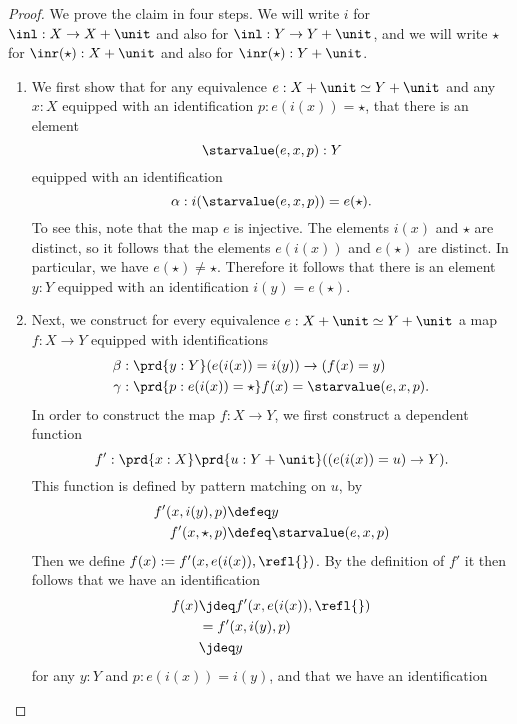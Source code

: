 \begin{proof}
  We prove the claim in four steps. We will write $i$ for $\inl:X\to X+\unit$ and also for $\inl:Y\to Y+\unit$, and we will write $\star$ for $\inr(\star):X+\unit$ and also for $\inr(\star):Y+\unit$.
  \begin{enumerate}
  \item We first show that for any equivalence $e:X+\unit\simeq Y+\unit$ and any $x:X$ equipped with an identification $p:e(i(x))=\star$, that there is an element
    \begin{equation*}
      \starvalue(e,x,p):Y
    \end{equation*}
    equipped with an identification
    \begin{equation*}
      \alpha:i(\starvalue(e,x,p))=e(\star).  
    \end{equation*}
    To see this, note that the map $e$ is injective. The elements $i(x)$ and $\star$ are distinct, so it follows that the elements $e(i(x))$ and $e(\star)$ are distinct. In particular, we have $e(\star)\neq\star$. Therefore it follows that there is an element $y:Y$ equipped with an identification $i(y)=e(\star)$. 
  \item Next, we construct for every equivalence $e:X+\unit\simeq Y+\unit$ a map $f:X\to Y$ equipped with identifications
    \begin{align*}
      \beta & : \prd{y:Y} (e(i(x))=i(y))\to (f(x)=y) \\
      \gamma & : \prd{p:e(i(x))=\star} f(x)=\starvalue(e,x,p).
    \end{align*}
    In order to construct the map $f:X\to Y$, we first construct a dependent function
    \begin{equation*}
      f':\prd{x:X}\prd{u:Y+\unit}((e(i(x))=u)\to Y).
    \end{equation*}
    This function is defined by pattern matching on $u$, by
    \begin{align*}
      f'(x,i(y),p) & \defeq y \\
      f'(x,\star,p) & \defeq \starvalue(e,x,p)
    \end{align*}
    Then we define $f(x):=f'(x,e(i(x)),\refl{})$. By the definition of $f'$ it then follows that we have an identification
    \begin{align*}
      f(x) & \jdeq f'(x,e(i(x)),\refl{}) \\
           & = f'(x,i(y),p) \\
           & \jdeq y
    \end{align*}
    for any $y:Y$ and $p:e(i(x))=i(y)$, and that we have an identification

\end{enumerate}
\end{proof}
